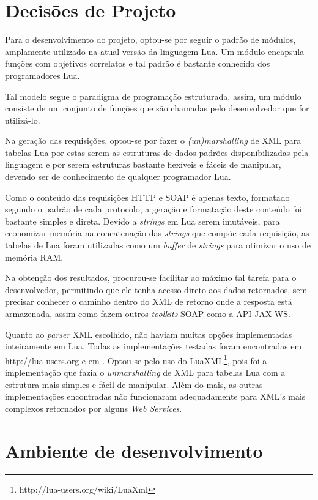 \section{Decisões de Projeto}

Para o desenvolvimento do projeto, optou-se por seguir o padrão
de módulos, amplamente utilizado na atual versão da linguagem Lua.
Um módulo encapsula funções com objetivos correlatos
e tal padrão é bastante conhecido dos programadores Lua.

Tal modelo segue o paradigma de programação estruturada, assim,
um módulo consiste de um conjunto de funções que são chamadas
pelo desenvolvedor que for utilizá-lo.

Na geração das requisições, optou-se por fazer o \textit{(un)marshalling}
de XML para tabelas Lua por estas serem as estruturas de dados
padrões disponibilizadas pela linguagem e por serem estruturas
bastante flexíveis e fáceis de manipular, devendo ser de conhecimento
de qualquer programador Lua.

Como o conteúdo das requisições HTTP e SOAP é apenas texto, formatado
segundo o padrão de cada protocolo, a geração e formatação
deste conteúdo foi bastante simples e direta. Devido a
\textit{strings} em Lua serem imutáveis\cite{ierusalimschy2006programming},
para economizar memória na concatenação das \textit{strings} que compõe
cada requisição, as tabelas de Lua foram utilizadas
como um \textit{buffer} de \textit{strings} para otimizar o uso de memória RAM.

Na obtenção dos resultados, procurou-se facilitar ao máximo
tal tarefa para o desenvolvedor, permitindo que ele
tenha acesso direto aos dados retornados, sem precisar
conhecer o caminho dentro do XML de retorno onde
a resposta está armazenada, assim como fazem outros \textit{toolkits} SOAP
como a API JAX-WS.

Quanto ao \textit{parser} XML escolhido, não haviam muitas opções
implementadas inteiramente em Lua. 
Todas as implementações testadas foram encontradas
em http://lua-users.org e em \cite{ierusalimschy2006programming}.
Optou-se pelo uso do LuaXML\footnote{http://lua-users.org/wiki/LuaXml},
pois foi a implementação que fazia o \textit{unmarshalling} de XML
para tabelas Lua com a estrutura mais simples e fácil de manipular.
Além do mais, as outras implementações encontradas não funcionaram
adequadamente para XML's mais complexos retornados
por alguns \textit{Web Services}.

\section{Ambiente de desenvolvimento}

